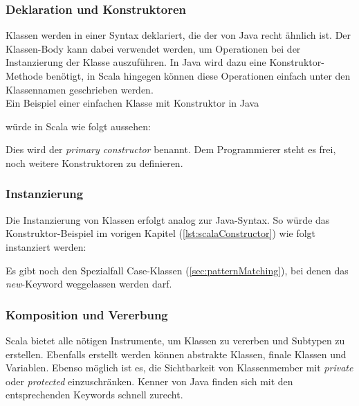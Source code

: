 \subsubsection{Deklaration und Konstruktoren}

Klassen werden in einer Syntax deklariert, die der von Java recht
ähnlich ist. Der Klassen-Body kann dabei verwendet werden,
um Operationen bei der Instanzierung der Klasse auszuführen. In Java
wird dazu eine Konstruktor-Methode benötigt, in Scala hingegen können
diese Operationen einfach unter den Klassennamen geschrieben werden. \\

Ein Beispiel einer einfachen Klasse mit Konstruktor in Java


würde in Scala wie folgt aussehen:


Dies wird der \emph{primary constructor} benannt. Dem Programmierer steht es 
frei, noch weitere Konstruktoren zu definieren.


\subsubsection{Instanzierung}

Die Instanzierung von Klassen erfolgt analog zur Java-Syntax. So würde das 
Konstruktor-Beispiel im vorigen Kapitel (\ref{lst:scalaConstructor}) wie 
folgt instanziert werden:



Es gibt noch den Spezialfall Case-Klassen (\ref{sec:patternMatching}),
bei denen das \emph{new}-Keyword weggelassen werden darf.

\subsubsection{Komposition und Vererbung}

Scala bietet alle nötigen Instrumente, um Klassen zu vererben und Subtypen
zu erstellen. Ebenfalls erstellt werden können abstrakte Klassen, finale
Klassen und Variablen. Ebenso möglich ist es, die Sichtbarkeit von 
Klassenmember mit \emph{private} oder \emph{protected} einzuschränken. 
Kenner von Java finden sich mit den entsprechenden Keywords 
schnell zurecht.\\

